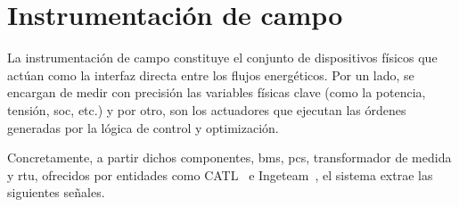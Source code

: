 \section{Instrumentación de campo}
\label{makereference3.2}

La instrumentación de campo constituye el conjunto de dispositivos físicos que actúan como la interfaz directa entre los flujos energéticos. Por un lado, se encargan de medir con precisión las variables físicas clave (como la potencia, tensión, \gls{soc}, etc.) y por otro, son los actuadores que ejecutan las órdenes generadas por la lógica de control y optimización.

Concretamente, a partir dichos componentes, \gls{bms}, \gls{pcs}, transformador de medida y \gls{rtu}, ofrecidos por entidades como CATL~\cite{catl2023catl} e Ingeteam~\cite{ingeteam2025ingeteam}, el sistema extrae las siguientes señales.

